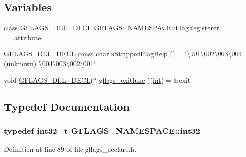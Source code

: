 \subsection*{Variables}
\begin{DoxyCompactItemize}
\item 
class \hyperlink{gflags__declare_8h_ab630d48e0b993f39ca96b0c4401f01cf}{G\+F\+L\+A\+G\+S\+\_\+\+D\+L\+L\+\_\+\+D\+E\+CL} \hyperlink{classGFLAGS__NAMESPACE_1_1FlagRegisterer}{G\+F\+L\+A\+G\+S\+\_\+\+N\+A\+M\+E\+S\+P\+A\+C\+E\+::\+Flag\+Registerer} \hyperlink{namespaceGFLAGS__NAMESPACE_a98149f2963ae58ae3e0106c879fc3a9a}{\+\_\+\+\_\+attribute}
\item 
\hyperlink{gflags__declare_8h_ab630d48e0b993f39ca96b0c4401f01cf}{G\+F\+L\+A\+G\+S\+\_\+\+D\+L\+L\+\_\+\+D\+E\+CL} const \hyperlink{CMakeCache_8txt_afe71f11dacb15682cdc012f7208e6e09}{char} \hyperlink{namespaceGFLAGS__NAMESPACE_a6051161932d2b5445384f4a6a264d75b}{k\+Stripped\+Flag\+Help} \mbox{[}$\,$\mbox{]} = \char`\"{}\textbackslash{}001\textbackslash{}002\textbackslash{}003\textbackslash{}004 (unknown) \textbackslash{}004\textbackslash{}003\textbackslash{}002\textbackslash{}001\char`\"{}
\item 
void \hyperlink{gflags__declare_8h_ab630d48e0b993f39ca96b0c4401f01cf}{G\+F\+L\+A\+G\+S\+\_\+\+D\+L\+L\+\_\+\+D\+E\+CL}($\ast$ \hyperlink{namespaceGFLAGS__NAMESPACE_a92540f20c8cabd198b987ac84a539078}{gflags\+\_\+exitfunc} )(\hyperlink{CMakeCache_8txt_a79a3d8790b2588b09777910863574e09}{int}) = \&exit
\end{DoxyCompactItemize}


\subsection{Typedef Documentation}
\subsubsection[{\texorpdfstring{int32}{int32}}]{\setlength{\rightskip}{0pt plus 5cm}typedef int32\+\_\+t {\bf G\+F\+L\+A\+G\+S\+\_\+\+N\+A\+M\+E\+S\+P\+A\+C\+E\+::int32}}\hypertarget{namespaceGFLAGS__NAMESPACE_ab5e093ecf2996943821e773cdf22140a}{}\label{namespaceGFLAGS__NAMESPACE_ab5e093ecf2996943821e773cdf22140a}


Definition at line 89 of file gflags\+\_\+declare.\+h.

